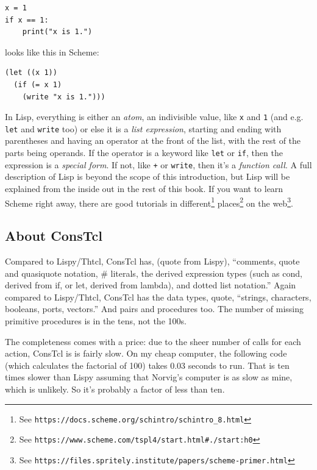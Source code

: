 \documentclass[twoside,9pt]{report}
\begin{document}
\begin{verbatim}
x = 1
if x == 1:
    print("x is 1.")
\end{verbatim}

\noindent looks like this in Scheme:

\begin{verbatim}
(let ((x 1))
  (if (= x 1)
    (write "x is 1.")))
\end{verbatim}

In Lisp, everything is either an \emph{atom}, an indivisible value, like
\texttt{x} and \texttt{1} (and e.g. \texttt{let} and \texttt{write} too) or
else it is a \emph{list expression}, starting and ending with parentheses and
having an operator at the front of the list, with the rest of the parts being
operands. If the operator is a keyword like \texttt{let} or \texttt{if}, then
the expression is a \emph{special form}. If not, like \texttt{+} or
\texttt{write}, then it's a \emph{function call}.  A full description of Lisp
is beyond the scope of this introduction, but Lisp will be explained from the
inside out in the rest of this book. If you want to learn Scheme right away, there are good tutorials in different\footnote{See \texttt{https://docs.scheme.org/schintro/schintro\_8.html}} places\footnote{See \texttt{https://www.scheme.com/tspl4/start.html\#./start:h0}} on the web\footnote{See \texttt{https://files.spritely.institute/papers/scheme-primer.html}}.

\subsection{About ConsTcl}
\label{about-constcl}

Compared to Lispy/Thtcl, ConsTcl has, (quote from Lispy), ``comments, quote and
quasiquote notation, \# literals, the derived expression types (such as cond,
derived from if, or let, derived from lambda), and dotted list notation.''
Again compared to Lispy/Thtcl, ConsTcl has the data types, quote, ``strings,
characters, booleans, ports, vectors.'' And pairs and procedures too. The
number of missing primitive procedures is in the tens, not the 100s. 

The completeness comes with a price: due to the sheer number of calls for each
action, ConsTcl is is fairly slow. On my cheap computer, the following code
(which calculates the factorial of 100) takes 0.03 seconds to run. That is ten
times slower than Lispy assuming that Norvig's computer is as slow as mine,
which is unlikely. So it's probably a factor of less than ten.
\end{document}
